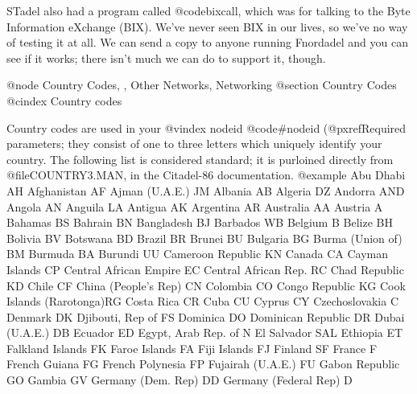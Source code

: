 {{{{STadel also had a program called @code{bixcall}, which was for talking
to the Byte Information eXchange (BIX).  We've never seen BIX in our
lives, so we've no way of testing it at all.  We can send a copy to anyone
running Fnordadel and you can see if it works; there isn't much we can
do to support it, though.

@node Country Codes,  , Other Networks, Networking
@section Country Codes
@cindex Country codes

Country codes are used in your
@vindex nodeid
@code{#nodeid} (@pxref{Required parameters};
they consist of one to three letters which uniquely identify your country.
The following list is considered standard; it is purloined directly from
@file{COUNTRY3.MAN}, in the Citadel-86 documentation.
@example
Abu Dhabi               AH      Afghanistan             AF
Ajman (U.A.E.)          JM      Albania                 AB
Algeria                 DZ      Andorra                 AND
Angola                  AN      Anguila                 LA 
Antigua                 AK      Argentina               AR
Australia               AA      Austria                 A
Bahamas                 BS      Bahrain                 BN 
Bangladesh              BJ      Barbados                WB 
Belgium                 B       Belize                  BH
Bolivia                 BV      Botswana                BD 
Brazil                  BR      Brunei                  BU
Bulgaria                BG      Burma (Union of)        BM
Burmuda                 BA      Burundi                 UU
Cameroon Republic       KN      Canada                  CA
Cayman Islands          CP      Central African Empire  EC
Central African Rep.    RC      Chad Republic           KD
Chile                   CF      China (People's Rep)    CN
Colombia                CO      Congo Republic          KG
Cook Islands (Rarotonga)RG      Costa Rica              CR
Cuba                    CU      Cyprus                  CY
Czechoslovakia          C       Denmark                 DK
Djibouti, Rep of        FS      Dominica                DO
Dominican Republic      DR      Dubai (U.A.E.)          DB
Ecuador                 ED      Egypt, Arab Rep. of     N
El Salvador             SAL     Ethiopia                ET
Falkland Islands        FK      Faroe Islands           FA
Fiji Islands            FJ      Finland                 SF
France                  F       French Guiana           FG
French Polynesia        FP      Fujairah (U.A.E.)       FU
Gabon Republic          GO      Gambia                  GV
Germany (Dem. Rep)      DD      Germany (Federal Rep)   D
}}}}
